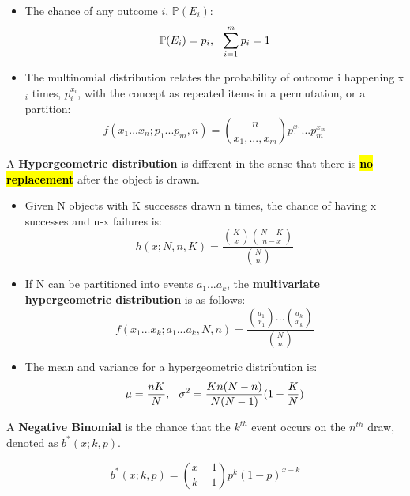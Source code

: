 \documentclass[10pt, letterpaper, twoside]{article}
\begin{document}
\begin{multicols}{2}
\begin{itemize}
    \item The chance of any outcome $i$, $\mathbb{P}(E_i)$:
    \begin{equation*}
        \mathbb{P}(E_i) = p_i, \hspace{0.25cm}\sum_{i=1}^mp_i = 1
    \end{equation*}
    \item The multinomial distribution relates the probability of outcome i happening x$_i$ times, $p_i^{x_i}$, with the concept as repeated items in a permutation, or a partition:
    \begin{equation*}
        f(x_1...x_n;p_1...p_m, n) = \binom{n}{x_1, ..., x_m}p_1^{x_1}...p_m^{x_m}
    \end{equation*}
\end{itemize}

A \textbf{Hypergeometric distribution} is different in the sense that there is \hl{\textbf{no replacement}} after the object is drawn.

\begin{itemize}
    \item Given N objects with K successes drawn n times, the chance of having x successes and n-x failures is:
    \begin{equation*}
        h(x;N,n,K) = \frac{\binom{K}{x}\binom{N-K}{n-x}}{\binom{N}{n}}
    \end{equation*}
    \item If N can be partitioned into events $a_1...a_k$, the \textbf{multivariate hypergeometric distribution} is as follows:
    \begin{equation*}
        f(x_1...x_k;a_1...a_k, N, n) =\frac{\binom{a_1}{x_1}...\binom{a_k}{x_k}}{\binom{N}{n}}
    \end{equation*}
    \item The mean and variance for a hypergeometric distribution is:
    \begin{equation*}
        \mu = \frac{nK}{N},\hspace{0.25cm}\sigma^2 = \frac{Kn(N-n)}{N(N-1)}(1-\frac{K}{N})
    \end{equation*}
    \end{itemize}
A \textbf{Negative Binomial} is the chance that the $k^{th}$ event occurs on the $n^{th}$ draw, denoted as $b^{*}(x;k,p)$.

\begin{equation*}
    b^{*}(x;k,p) = \binom{x-1}{k-1}p^k(1-p)^{x-k}
\end{equation*}


\end{multicols}
\end{document}
